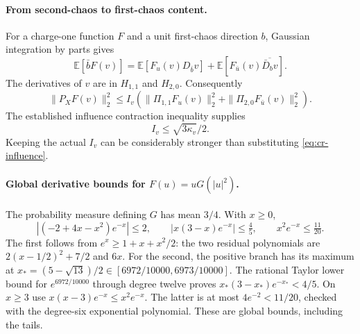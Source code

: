 \paragraph{From second-chaos to first-chaos content.}
For a charge-one function $F$ and a unit first-chaos direction $b$,
Gaussian integration by parts gives
\[
 \mathbb E[\bar bF(v)]
 =\mathbb E[F_u(v)D_{\bar b}v]
       +\mathbb E[F_{\bar u}(v)\overline{\bar D_bv}].
\]
The derivatives of $v$ are in $H_{1,1}$ and $H_{2,0}$. Consequently
\begin{equation}\label{eq:cr-content}
 \|P_XF(v)\|_2^2\le I_v
     \left(\|\Pi_{1,1}F_u(v)\|_2^2+
           \|\Pi_{2,0}F_{\bar u}(v)\|_2^2\right).
\end{equation}
The established influence contraction inequality supplies
\begin{equation}\label{eq:cr-influence}
 I_v\le\sqrt{3\kappa_v}/2.
\end{equation}
Keeping the actual $I_v$ can be considerably stronger than substituting
\eqref{eq:cr-influence}.

\paragraph{Global derivative bounds for $F(u)=uG(|u|^2)$.}
The probability measure defining $G$ has mean $3/4$. With $x\ge0$,
\begin{equation}\label{eq:cr-exp-bounds}
 |(-2+4x-x^2)e^{-x}|\le2,\qquad
 |x(3-x)e^{-x}|\le\tfrac45,\qquad
 x^2e^{-x}\le\tfrac{11}{20}.
\end{equation}
The first follows from $e^x\ge1+x+x^2/2$: the two residual
polynomials are $2(x-1/2)^2+7/2$ and $6x$.
For the second, the positive branch has its maximum at
$x_*=(5-\sqrt{13})/2\in[6972/10000,6973/10000]$.
The rational Taylor lower bound for $e^{6972/10000}$ through degree
twelve proves $x_*(3-x_*)e^{-x_*}<4/5$.
On $x\ge3$ use $x(x-3)e^{-x}\le x^2e^{-x}$.
The latter is at most $4e^{-2}<11/20$, checked with the degree-six
exponential polynomial. These are global bounds, including the tails.

